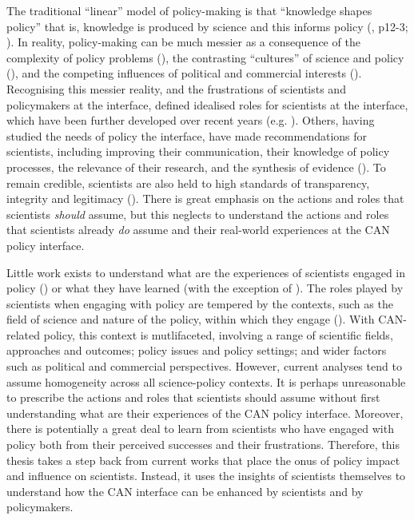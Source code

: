 The traditional ``linear'' model of policy-making is that ``knowledge shapes policy'' that is, knowledge is produced by science and this informs policy (\cite{Pielke2007}, p12-3; \cite{BoswellS2017}). In reality, policy-making can be much messier as a consequence of the complexity of policy problems (\cite{Cairney2016}), the contrasting ``cultures'' of science and policy (\cite{Dale2002,Obermeister2022}), and the competing influences of political and commercial interests (\cite{StoddardEtAl2021}). Recognising this messier reality, and the frustrations of scientists and policymakers at the interface, \textcite{Pielke2007} defined idealised roles for scientists at the interface, which have been further developed over recent years (e.g. \cite{RapleyD2014,GluckmanBK2021,GregoryBW2024}). Others, having studied the needs of policy the interface, have made recommendations for scientists, including improving their communication, their knowledge of policy processes, the relevance of their research, and the synthesis of evidence (\cite{KennyRHTB2017,LubchencoR2020,GluckmanBK2021,Bisbal2024}). To remain credible, scientists are also held to high standards of transparency, integrity and legitimacy (\cite{KennyRHTB2017,ColognaKMBMO2024,GregoryBW2024}). There is great emphasis on the actions and roles that scientists \emph{should} assume, but this neglects to understand the actions and roles that scientists already \emph{do} assume and their real-world experiences at the CAN policy interface.

Little work exists to understand what are the experiences of scientists engaged in policy (\cite{KennyRHTB2017}) or what they have learned (with the exception of \cite{Obermeister2022}). The roles played by scientists when engaging with policy are tempered by the contexts, such as the field of science and nature of the policy, within which they engage (\cite{EdlerKB2022}). With CAN-related policy, this context is mutlifaceted, involving a range of scientific fields, approaches and outcomes; policy issues and policy settings; and wider factors such as political and commercial perspectives. However, current analyses tend to assume homogeneity across all science-policy contexts. It is perhaps unreasonable to prescribe the actions and roles that scientists should assume without first understanding what are their experiences of the CAN policy interface. Moreover, there is potentially a great deal to learn from scientists who have engaged with policy both from their perceived successes and their frustrations. Therefore, this thesis takes a step back from current works that place the onus of policy impact and influence on scientists. Instead, it uses the insights of scientists themselves to understand how the CAN interface can be enhanced by scientists and by policymakers.

